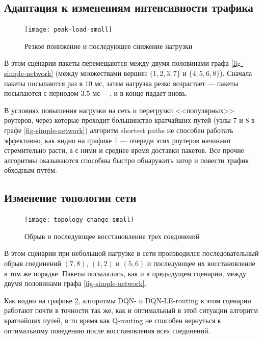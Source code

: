 \documentclass[specification,annotation,times]{itmo-student-thesis}
\theoremstyle{definition}
\begin{document}
\subsection{Адаптация к изменениям интенсивности трафика}

\begin{figure}[!h]
  \caption{Резкое понижение и последующее снижение нагрузки}\label{experiments:network:peak-load-small}
  \centering
  \texttt{[image: peak-load-small]}
\end{figure}

В этом сценарии пакеты перемещаются между двумя половинами
графа \ref{fig-simple-network} (между множествами вершин $\{1, 2, 3, 7\}$ и
$\{4, 5, 6, 8\}$). Сначала пакеты посылаются раз в 10 мс, затем нагрузка резко
возрастает --- пакеты посылаются с периодом 3.5 мс ---, и в конце падает вновь.

В условиях повышения нагрузки на сеть и перегрузки <<популярных>> роутеров,
через которые проходит большинство кратчайших путей (узлы 7 и 8 в графе
\ref{fig-simple-network}) алгоритм shortest paths не способен работать эффективно,
как видно на графике \ref{experiments:network:peak-load-small} --- очереди этих
роутеров начинают стремительно расти, а с ними и среднее время доставки пакетов.
Все прочие алгоритмы оказываются способны быстро обнаружить затор и повести
трафик обходным путём.

\subsection{Изменение топологии сети}\label{experiments:simple/links}

\begin{figure}[!h]
  \caption{Обрыв и последующее восстановление трех соединений}\label{experiments:network:topology-change-small}
  \centering
  \texttt{[image: topology-change-small]}
\end{figure}

В этом сценарии при небольшой нагрузке в сети производился последовательный
обрыв соединений $(7, 8)$, $(1, 2)$ и $(5, 6)$ и последующее их восстановление в том
же порядке. Пакеты посылались, как и в предыдущем сценарии, между двумя
половинами графа \ref{fig-simple-network}.

Как видно на графике \ref{experiments:network:topology-change-small}, алгоритмы
DQN- и DQN-LE-routing в этом сценарии работают почти в точности так же, как и
оптимальный в этой ситуации алгоритм кратчайших путей, в то время как Q-routing
не способен вернуться к оптимальному поведению после восстановления всех
соединений.
\end{document}
